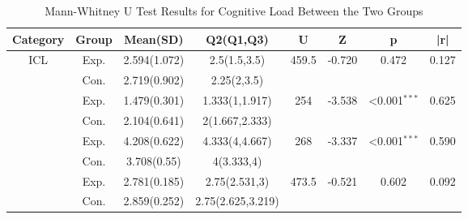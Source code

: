 \documentclass[runningheads]{llncs}
\begin{document}
\begin{table}[t]
\centering
\setlength{\tabcolsep}{2.8pt} %
\caption{Mann-Whitney U Test Results for Cognitive Load Between the Two Groups}
\label{tab:cognitive-load}
\begin{tabularx}{\textwidth}{
  cccccccc
  }
\toprule
\textbf{Category} & \textbf{Group} & \textbf{Mean(SD)} & \textbf{Q2(Q1,Q3)} & \textbf{U} & \textbf{Z} & \textbf{p} & \textbf{|r|} \\
\midrule
\multirow{2}{*}{ICL} 
& Exp. & 2.594(1.072) & 2.5(1.5,3.5) & \multirow{2}{*}{459.5} & \multirow{2}{*}{-0.720} & \multirow{2}{*}{0.472} & \multirow{2}{*}{0.127} \\
& Con. & 2.719(0.902) & 2.25(2,3.5) \\
\addlinespace
\multirow{2}{*}{ECL} 
& Exp. & 1.479(0.301) & 1.333(1,1.917) & \multirow{2}{*}{254} & \multirow{2}{*}{-3.538} & \multirow{2}{*}{<0.001\(^{***}\)} & \multirow{2}{*}{0.625} \\
& Con. & 2.104(0.641) & 2(1.667,2.333) \\
\addlinespace
\multirow{2}{*}{GCL} 
& Exp. & 4.208(0.622) & 4.333(4,4.667) & \multirow{2}{*}{268} & \multirow{2}{*}{-3.337} & \multirow{2}{*}{<0.001\(^{***}\)} & \multirow{2}{*}{0.590} \\
& Con. & 3.708(0.55) & 4(3.333,4) \\
\addlinespace
\multirow{2}{*}{Total} 
& Exp. & 2.781(0.185) & 2.75(2.531,3) & \multirow{2}{*}{473.5} & \multirow{2}{*}{-0.521} & \multirow{2}{*}{0.602} & \multirow{2}{*}{0.092} \\
& Con. & 2.859(0.252) & 2.75(2.625,3.219) \\
\bottomrule
\end{tabularx}
\end{table}
\end{document}
